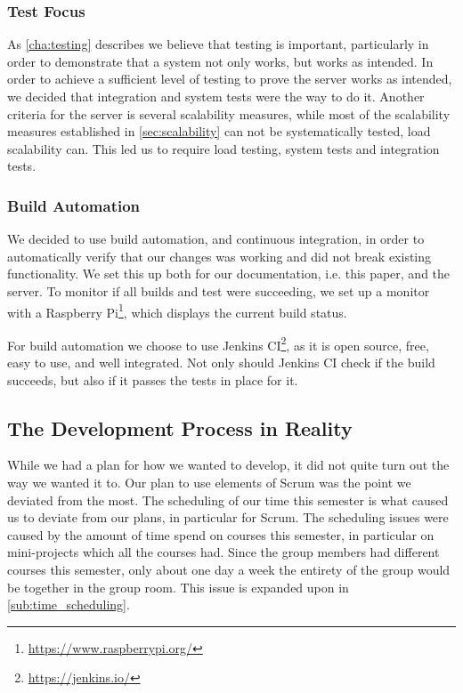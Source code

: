 \subsubsection{Test Focus}
As \cref{cha:testing} describes we believe that testing is important, particularly in order to demonstrate that a system not only works, but works as intended.
In order to achieve a sufficient level of testing to prove the server works as intended, we decided that integration and system tests were the way to do it.
Another criteria for the server is several scalability measures, while most of the scalability measures established in \cref{sec:scalability} can not be systematically tested, load scalability can.
This led us to require load testing, system tests and integration tests.
\subsubsection{Build Automation}
We decided to use build automation, and continuous integration, in order to automatically verify that our changes was working and did not break existing functionality.
We set this up both for our documentation, i.e. this paper, and the server.
To monitor if all builds and test were succeeding, we set up a monitor with a Raspberry Pi\footnote{\url{https://www.raspberrypi.org/}}, which displays the current build status.

For build automation we choose to use Jenkins CI\footnote{\url{https://jenkins.io/}}, as it is open source, free, easy to use, and well integrated.
Not only should Jenkins CI check if the build succeeds, but also if it passes the tests in place for it. 

\subsection{The Development Process in Reality}
While we had a plan for how we wanted to develop, it did not quite turn out the way we wanted it to.
Our plan to use elements of Scrum was the point we deviated from the most.
The scheduling of our time this semester is what caused us to deviate from our plans, in particular for Scrum.
The scheduling issues were caused by the amount of time spend on courses this semester, in particular on mini-projects which all the courses had.
Since the group members had different courses this semester, only about one day a week the entirety of the group would be together in the group room.
This issue is expanded upon in \cref{sub:time_scheduling}.
